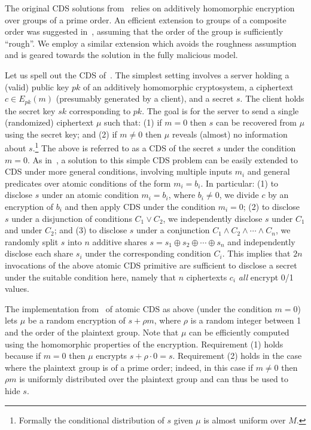 \documentclass[11pt]{article}
\begin{document}
The original CDS solutions from~\cite{AIR01}  relies on additively homomorphic
encryption over groups of a prime order. An efficient extension to
groups of a composite order was suggested in~\cite{L05}, assuming
that the order of the group is sufficiently ``rough''. We employ a
similar extension which avoids the roughness assumption and is
geared towards the solution in the fully malicious model.

Let us spell out the CDS of~\cite{AIR01}. The simplest
setting involves a server holding a (valid) public key $pk$ of an additively
homomorphic cryptosystem, a ciphertext $c\in E_{pk}(m)$ (presumably
generated by a client), and a secret $s$. The client holds the
secret key $sk$ corresponding to $pk$. The goal is for the server
to send a single (randomized) ciphertext $\mu$ such that: (1) if
$m=0$ then $s$ can be recovered from $\mu$ using the secret key;
and (2) if $m\neq 0$ then $\mu$ reveals (almost) no information
about $s$.\footnote{Formally the conditional distribution of $s$ given $\mu$ is almost uniform over $M$.} The above is referred to as a CDS of the secret $s$
under the condition $m=0$. As in~\cite{GIKM,AIR01}, a solution to
this simple CDS problem can be easily extended to CDS under more
general conditions, involving multiple inputs $m_i$ and general
predicates over atomic conditions of the form $m_i=b_i$. In
particular: (1) to disclose $s$ under an atomic condition
$m_i=b_i$, where $b_i\neq 0$, we divide $c$ by an encryption of
$b_i$ and then apply CDS under the condition $m_i=0$; (2) to
disclose $s$ under a disjunction of conditions $C_1\vee C_2$, we
independently disclose $s$ under $C_1$ and under $C_2$; and (3) to
disclose $s$ under a conjunction $C_1\wedge C_2\wedge \cdots \wedge
C_n$, we randomly split $s$ into $n$ additive shares $s=s_1\oplus
s_2\oplus\cdots\oplus s_n$ and independently disclose each share
$s_i$ under the corresponding condition $C_i$. This implies that
$2n$ invocations of the above atomic CDS primitive are sufficient
to disclose a secret under the suitable condition here, namely that
$n$ ciphertexts $c_i$ {\em all} encrypt 0/1 values.

The implementation from~\cite{AIR01} of atomic CDS as above (under
the condition $m=0$) lets $\mu$ be a random encryption of $s+\rho
m$, where $\rho$ is a random integer between 1 and the order of the
plaintext group. Note that $\mu$ can be efficiently computed using
the homomorphic properties of the encryption. Requirement (1) holds
because if $m=0$ then $\mu$ encrypts $s+\rho\cdot 0=s$. Requirement
(2) holds in the case where the plaintext group is of a prime
order; indeed, in this case if $m\neq 0$ then $\rho m$ is uniformly
distributed over the plaintext group and can thus be used to hide
$s$.
\end{document}
